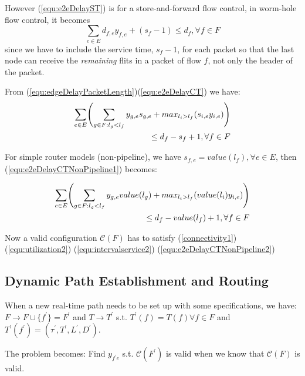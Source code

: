 \documentclass[conference, twocolumn]{IEEEtran}
\theoremstyle{definition}
\begin{document}
However (\ref{equ:e2eDelayST}) is for a store-and-forward flow control, in
worm-hole flow control, it becomes
\begin{equation}\label{equ:e2eDelayCT}
\sum_{e \in E}d_{f,e}y_{f,e} + (s_f - 1) \leq d_f, \forall f \in F
\end{equation}
since we have to include the service time, $s_f-1$, for each
packet so that the last node can receive the {\em remaining} flits in a
packet of flow $f$, not only the header of the packet.


From (\ref{equ:edgeDelayPacketLength})(\ref{equ:e2eDelayCT}) we have:
\begin{eqnarray}\label{equ:e2eDelayCTNonPipeline1}
\sum_{e \in E} \Biggl(\sum_{g \in F:l_g <
l_f}y_{g,e}s_{g,e} +max_{l_i>l_f}(s_{i,e}y_{i,e})\Biggr)\notag \\ \leq
d_f-s_f + 1, \forall f \in F
\end{eqnarray}

For simple router models (non-pipeline), we have $s_{f,e} = value(l_f),\forall e
\in E$, then (\ref{equ:e2eDelayCTNonPipeline1}) becomes:

\begin{eqnarray}\label{equ:e2eDelayCTNonPipeline2}
\sum_{e \in E} \Biggl(\sum_{g \in F:l_g <
l_f}y_{g,e}value(l_g) +max_{l_i>l_f}(value(l_i)y_{i,e})\Biggr)\notag \\ \leq
d_f-value(l_f) + 1, \forall f \in F
\end{eqnarray}

Now a valid configuration $\mathcal{C}(F)$ has to satisfy (\ref{connectivity1}) 
(\ref{equ:utilization2})
(\ref{equ:intervalservice2}) (\ref{equ:e2eDelayCTNonPipeline2})

\subsection{Dynamic Path Establishment and Routing}
When a new real-time path needs to be set up with some specifications, we have:
$F \rightarrow F \cup \{f^{'} \}=F^{'}$
and $T \rightarrow T^{'}$ s.t. $T^{'} (f)=T(f)\forall f \in F$ and $T^{'}
(f^{'})=(\tau ^{'}, T^{'}, L^{'}, D^{'})$.

The problem becomes: Find $y_{f^{'}e}$ s.t. $\mathcal{C}(F^{'})$ is valid
when we know that $\mathcal{C}(F)$ is valid.
\end{document}
